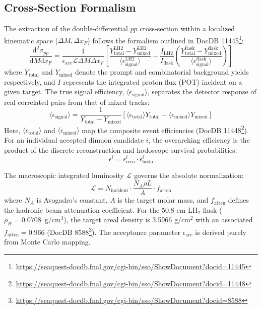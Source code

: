 \documentclass[11pt]{article}
\newcommand{\diffd}{\mathrm{d}}
\begin{document}
\subsection{Cross-Section Formalism}
The extraction of the double-differential $pp$ cross-section within a localized kinematic space ($\Delta M, \Delta x_F$) follows the formalism outlined in DocDB 11445\footnote{\url{https://seaquest-docdb.fnal.gov/cgi-bin/sso/ShowDocument?docid=11445}}:
\begin{equation}
    \frac{\diffd^{2}\sigma_{pp}}{\diffd M \diffd x_{F}} = \frac{1}{\epsilon_{\text{acc}} \mathcal{L} \Delta M \Delta x_{F}} 
    \left[ 
        \frac{Y^{\text{LH2}}_{\text{total}} - Y^{\text{LH2}}_{\text{mixed}}}{\langle\epsilon^{\text{LH2}}_{\text{signal}}\rangle} 
        - \frac{I_{\text{LH2}}}{I_{\text{flask}}} 
        \left( \frac{Y^{\text{flask}}_{\text{total}} - Y^{\text{flask}}_{\text{mixed}}}{\langle\epsilon^{\text{flask}}_{\text{signal}}\rangle} \right)
    \right]
    \label{eq:modified_cross_section}
\end{equation}
where $Y_{\text{total}}$ and $Y_{\text{mixed}}$ denote the prompt and combinatorial background yields respectively, and $I$ represents the integrated proton flux (POT) incident on a given target. The true signal efficiency, $\langle\epsilon_{\text{signal}}\rangle$, separates the detector response of real correlated pairs from that of mixed tracks:
\begin{equation}
    \label{eq:avg_signal_eff}
    \langle\epsilon_{\text{signal}}\rangle = \frac{1}{Y_{\text{total}} - Y_{\text{mixed}}}\left[\langle\epsilon_{\text{total}}\rangle Y_{\text{total}} - \langle\epsilon_{\text{mixed}}\rangle Y_{\text{mixed}}\right]
\end{equation}
Here, $\langle\epsilon_{\text{total}}\rangle$ and $\langle\epsilon_{\text{mixed}}\rangle$ map the composite event efficiencies (DocDB 11448\footnote{\url{https://seaquest-docdb.fnal.gov/cgi-bin/sso/ShowDocument?docid=11448}}). For an individual accepted dimuon candidate $i$, the overarching efficiency is the product of the discrete reconstruction and hodoscope survival probabilities:
\begin{equation}
    \label{eq:total_eff}
    \epsilon^{i} = \epsilon^{i}_{\text{reco}} \cdot \epsilon^{i}_{\text{hodo}}
\end{equation}

The macroscopic integrated luminosity $\mathcal{L}$ governs the absolute normalization:
\begin{equation}
\mathcal{L} = N_{\text{incident}} \cdot \frac{N_{A} \rho L}{A} \cdot f_{\text{atten}}
\label{eq:luminosity}
\end{equation}
where $N_A$ is Avogadro's constant, $A$ is the target molar mass, and $f_{\text{atten}}$ defines the hadronic beam attenuation coefficient. For the $50.8$ cm LH$_2$ flask ($\rho_H=0.0708$~g/cm$^3$), the target areal density is 3.5966 g/cm$^2$ with an associated $f_{\text{atten}} = 0.966$ (DocDB 8588\footnote{\url{https://seaquest-docdb.fnal.gov/cgi-bin/sso/ShowDocument?docid=8588}}). The acceptance parameter $\epsilon_{\text{acc}}$ is derived purely from Monte Carlo mapping.
\end{document}
